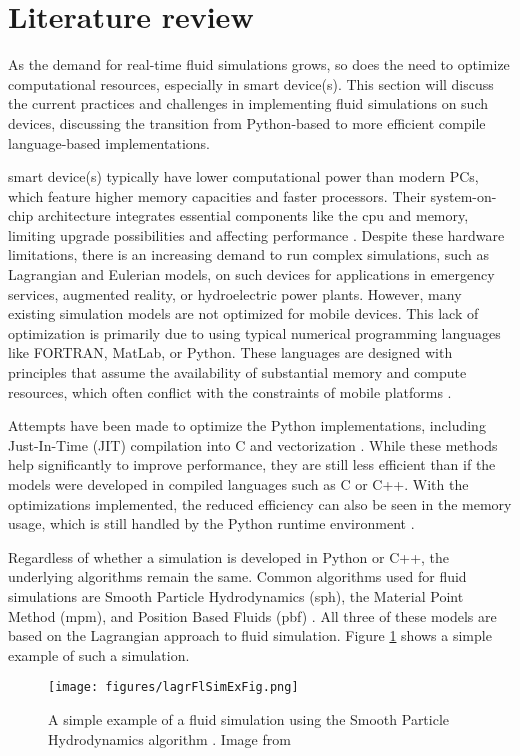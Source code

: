 \section{Literature review} \label{section: background information}

As the demand for real-time fluid simulations grows, so does the need to optimize computational resources, especially in \gls{smart device(s)}. This section will discuss the current practices and challenges in implementing fluid simulations on such devices, discussing the transition from Python-based to more efficient compile language-based implementations. \weirdparaend

\Gls{smart device(s)} typically have lower computational power than modern PCs, which feature higher memory capacities and faster processors. Their system-on-chip architecture integrates essential components like the \acrshort{cpu} and memory, limiting upgrade possibilities and affecting performance \cite{mobileProcessorArch}. Despite these hardware limitations, there is an increasing demand to run complex simulations, such as Lagrangian and Eulerian models, on such devices for applications in emergency services, augmented reality, or hydroelectric power plants.
However, many existing simulation models are not optimized for mobile devices. This lack of optimization is primarily due to using typical numerical programming languages like FORTRAN, MatLab, or Python. These languages are designed with principles that assume the availability of substantial memory and compute resources, which often conflict with the constraints of mobile platforms \cite{PythonVSCpp}. \paraend

Attempts have been made to optimize the Python implementations, including Just-In-Time (JIT) compilation into C \cite{JIT}\cite{kehl2021speeding}
and vectorization \cite{VectorizedPython}.
While these methods help significantly to improve performance, they are still less efficient than if the models were developed in compiled languages such as C or C++. With the optimizations implemented, the reduced efficiency can also be seen in the memory usage, which is still handled by the Python runtime environment \cite{PythonOVerallimprovementsNumbers}. \paraend

Regardless of whether a simulation is developed in Python or C++, the underlying algorithms remain the same. 
Common algorithms used for fluid simulations are Smooth Particle Hydrodynamics (\acrshort{sph}), the Material Point Method (\acrshort{mpm}), and Position Based Fluids (\acrshort{pbf}) \cite{bridson2015fluid}.
All three of these models are based on the Lagrangian approach to fluid simulation. Figure \ref{fig:sph} shows a simple example of such a simulation.
\begin{figure}[H]
    \centering
    \texttt{[image: figures/lagrFlSimExFig.png]}
    \caption{A simple example of a fluid simulation using the Smooth Particle Hydrodynamics algorithm \cite{sph}. Image from \cite{sphFigure}}
    \label{fig:sph}
\end{figure}

